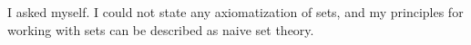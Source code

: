 \subsection{}

I asked myself.
I could not state any axiomatization of sets, and my principles for working with sets can be described as naive set theory.
